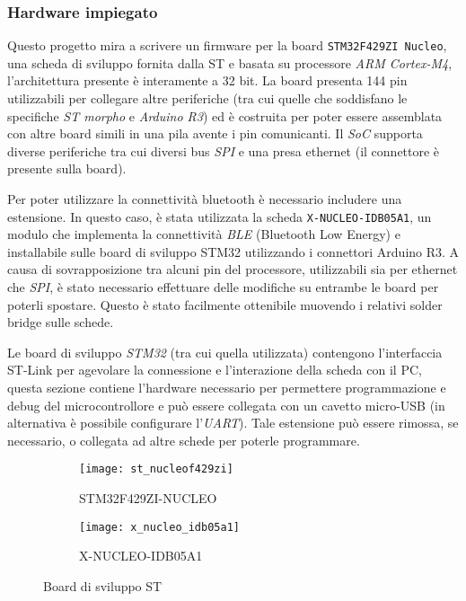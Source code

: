 \subsubsection{Hardware impiegato}


Questo progetto mira a scrivere un firmware per la board \texttt{STM32F429ZI Nucleo}, una scheda di sviluppo fornita dalla ST e basata su processore \textit{ARM Cortex-M4}, l'architettura presente \`e interamente a 32 bit. La board presenta 144 pin utilizzabili per collegare altre periferiche (tra cui quelle che soddisfano le specifiche \textit{ST morpho} e \textit{Arduino R3}) ed \`e costruita per poter essere assemblata con altre board simili in una pila avente i pin comunicanti. Il \textit{SoC} supporta diverse periferiche tra cui diversi bus \textit{SPI} e una presa ethernet (il connettore \`e presente sulla board).

Per poter utilizzare la connettivit\`a bluetooth \`e necessario includere una estensione. In questo caso, \`e stata utilizzata la scheda \texttt{X-NUCLEO-IDB05A1}, un modulo che implementa la connettivit\`a \textit{BLE} (Bluetooth Low Energy) e installabile sulle board di sviluppo STM32 utilizzando i connettori Arduino R3. A causa di sovrapposizione tra alcuni pin del processore, utilizzabili sia per ethernet che \textit{SPI}, \`e stato necessario effettuare delle modifiche su entrambe le board per poterli spostare. Questo \`e stato facilmente ottenibile muovendo i relativi solder bridge sulle schede.

Le board di sviluppo \textit{STM32} (tra cui quella utilizzata) contengono l'interfaccia ST-Link per agevolare la connessione e l'interazione della scheda con il PC, questa sezione contiene l'hardware necessario per permettere programmazione e debug del microcontrollore e pu\`o essere collegata con un cavetto micro-USB (in alternativa \`e possibile configurare l'\textit{UART}). Tale estensione pu\`o essere rimossa, se necessario, o collegata ad altre schede per poterle programmare.

\begin{figure}[ht]
  \center
  \begin{subfigure}{.45\textwidth}
    \texttt{[image: st\_nucleof429zi]}
    \caption{STM32F429ZI-NUCLEO}
  \end{subfigure}
  \hfill
  \begin{subfigure}{.45\textwidth}
    \texttt{[image: x\_nucleo\_idb05a1]}
    \caption{X-NUCLEO-IDB05A1}
  \end{subfigure}
  \caption{Board di sviluppo ST}
  \label{fig:boards}
\end{figure}

